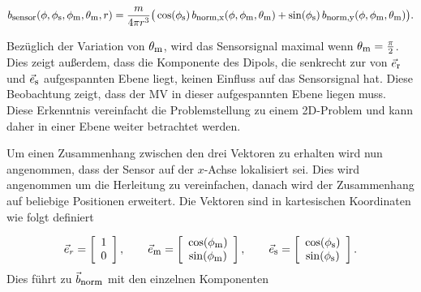 \begin{equation}
    b_{\textrm{\footnotesize{sensor}}}(\phi,\phi_{\textrm{\footnotesize{s}}},\phi_{\textrm{\footnotesize{m}}},\theta_{\textrm{\footnotesize{m}}},r) =  \frac{ m }{4 \pi r^3} \big(\cos(\phi_{\textrm{\footnotesize{s}}})\, b_{\textrm{\footnotesize{norm,x}}}(\phi,\phi_{\textrm{\footnotesize{m}}},\theta_{\textrm{\footnotesize{m}}}) + \sin(\phi_{\textrm{\footnotesize{s}}})\, b_{\textrm{\footnotesize{norm,y}}}(\phi,\phi_{\textrm{\footnotesize{m}}},\theta_{\textrm{\footnotesize{m}}})\big).
    \label{eq:normSensor}
\end{equation}

Bezüglich der Variation von $\theta_{\textrm{\footnotesize{m}}}$, wird das Sensorsignal maximal wenn $\theta_{\textrm{\footnotesize{m}}} = \frac{\pi}{2}$. Dies zeigt außerdem, dass die Komponente des Dipols, die senkrecht zur von $\vec{e}_{\textrm{\footnotesize{r}}}$ und $\vec{e}_{\textrm{\footnotesize{s}}}$ aufgespannten Ebene liegt, keinen Einfluss auf das Sensorsignal hat. Diese Beobachtung zeigt, dass der MV in dieser aufgespannten Ebene liegen muss. Diese Erkenntnis vereinfacht die Problemstellung zu einem 2D-Problem und kann daher in einer Ebene weiter betrachtet werden.

Um einen Zusammenhang zwischen den drei Vektoren zu erhalten wird nun angenommen, dass der Sensor auf der $x$-Achse lokalisiert sei. Dies wird angenommen um die Herleitung zu vereinfachen, danach wird der Zusammenhang auf beliebige Positionen erweitert. Die Vektoren sind in kartesischen Koordinaten wie folgt definiert

\begin{equation}
    \vec{e}_r = \left[\begin{array}{c} 1\\ 0 \end{array}\right],\qquad
    \vec{e}_{\textrm{\footnotesize{m}}} = \left[\begin{array}{c} \cos(\phi_{\textrm{\footnotesize{m}}}) \\ \sin(\phi_{\textrm{\footnotesize{m}}}) \end{array}\right],\qquad
    \vec{e}_{\textrm{\footnotesize{s}}} = \left[\begin{array}{c} \cos(\phi_{\textrm{\footnotesize{s}}})\\ \sin(\phi_{\textrm{\footnotesize{s}}})\end{array}\right].
    \label{eq:defErEmEs}
\end{equation}
Dies führt zu $\vec{b}_{\textrm{\footnotesize{norm}}}$ mit den einzelnen Komponenten  

